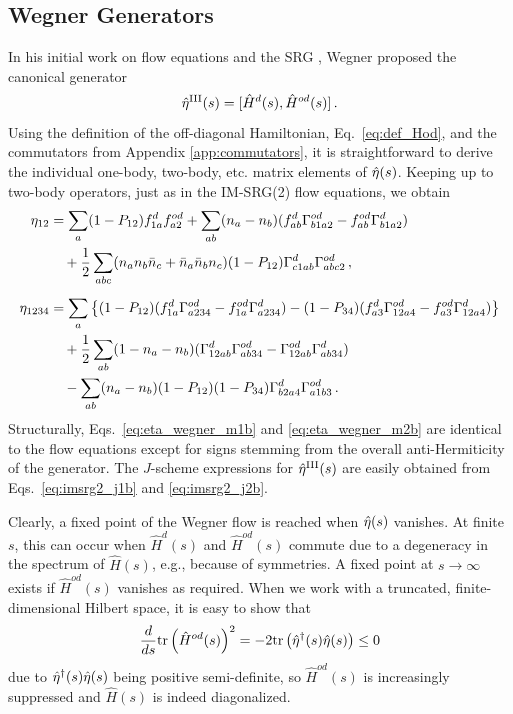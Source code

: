 \subsection{\label{sec:generators_Wegner}Wegner Generators}
In his initial work on flow equations and the SRG \cite{Wegner:1994dk}, Wegner proposed the canonical generator 
\begin{equation}\label{eq:eta_wegner}
  \etaO^\text{III}(s) = \comm{\hat{H}^d(s)}{\hat{H}^{od}(s)}\,.
\end{equation}
Using the definition of the off-diagonal Hamiltonian, Eq.~\eqref{eq:def_Hod}, and the commutators from Appendix \ref{app:commutators}, it is straightforward to derive the individual one-body, two-body, etc. matrix elements of $\hat{\eta}(s)$. Keeping up to two-body operators, just as in the IM-SRG(2) flow equations, we obtain
\begin{align}
  \eta_{12} &= 
  \sum_{a}(1-P_{12})f^d_{1a}f^{od}_{a2} +\sum_{ab}(n_a-n_b)(f^d_{ab}\Gamma^{od}_{b1a2}-f^{od}_{ab}\Gamma^d_{b1a2}) \notag\\ 
  &\quad +\frac{1}{2} \sum_{abc}(n_an_b\bar{n}_c+\bar{n}_a\bar{n}_bn_c) (1-P_{12})\Gamma^d_{c1ab}\Gamma^{od}_{abc2}
  \label{eq:eta_wegner_m1b}\,,\\[5pt]
  \eta_{1234}&= 
  \sum_{a}\left\{ 
    (1-P_{12})(f^d_{1a}\Gamma^{od}_{a234}-f^{od}_{1a}\Gamma^{d}_{a234} )
    -(1-P_{34})(f^{d}_{a3}\Gamma^{od}_{12a4}-f^{od}_{a3}\Gamma^d_{12a4} )
    \right\}\notag \\
  &\quad+ \frac{1}{2}\sum_{ab}(1-n_a-n_b)(\Gamma^d_{12ab}\Gamma^{od}_{ab34}-\Gamma^{od}_{12ab}\Gamma^d_{ab34})\notag\\
  &\quad-\sum_{ab}(n_a-n_b) (1-P_{12})(1-P_{34})\Gamma^d_{b2a4}\Gamma^{od}_{a1b3}
    \label{eq:eta_wegner_m2b}\,.
\end{align}
Structurally, Eqs.~\eqref{eq:eta_wegner_m1b} and \eqref{eq:eta_wegner_m2b} are identical to the flow equations except for signs stemming from the overall anti-Hermiticity of the generator. The $J$-scheme expressions for $\hat{\eta}^\text{III}(s)$ are easily obtained from Eqs.~\eqref{eq:imsrg2_j1b} and \eqref{eq:imsrg2_j2b}.

Clearly, a fixed point of the Wegner flow is reached when $\hat{\eta}(s)$ vanishes. At finite $s$, this can occur when $\hat{H}^d(s)$ and $\hat{H}^{od}(s)$ commute due to a degeneracy in the spectrum of $\hat{H}(s)$, e.g., because of symmetries. A fixed point at $s\to\infty$ exists if $\hat{H}^{od}(s)$ vanishes as required. When we work with a truncated, finite-dimensional Hilbert space, it is easy to show that \cite{Wegner:1994dk,Kehrein:2006kx}
\begin{equation} \label{eq:steepest_descent}
  \totd{}{s}\mathrm{tr}\left(\hat{H}^{od}(s)\right)^2 = -2 \mathrm{tr}\left(\etaO^\dag(s)\etaO(s)\right)\leq 0
\end{equation}
due to $\hat{\eta}^\dag(s)\hat{\eta}(s)$ being positive semi-definite, so $\hat{H}^{od}(s)$ is increasingly suppressed and $\hat{H}(s)$ is indeed diagonalized. 

